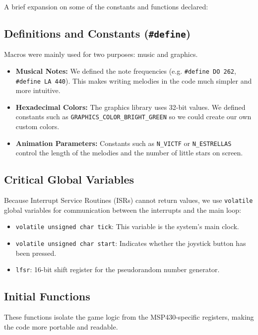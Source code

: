 \documentclass[11pt]{article}
\begin{document}
A brief expansion on some of the constants and functions declared:

\subsection{Definitions and Constants (\texttt{\#define})}

Macros were mainly used for two purposes: music and graphics.

\begin{itemize}
    \item \textbf{Musical Notes:} We defined the note frequencies (e.g. \texttt{\#define DO 262}, \texttt{\#define LA 440}). This makes writing melodies in the code much simpler and more intuitive.
    \item \textbf{Hexadecimal Colors:} The graphics library uses 32-bit values. We defined constants such as \texttt{GRAPHICS\_COLOR\_BRIGHT\_GREEN} so we could create our own custom colors.
    \item \textbf{Animation Parameters:} Constants such as \texttt{N\_VICTF} or \texttt{N\_ESTRELLAS} control the length of the melodies and the number of little stars on screen.
\end{itemize}

\subsection{Critical Global Variables}

Because Interrupt Service Routines (ISRs) cannot return values, we use \texttt{volatile} global variables for communication between the interrupts and the main loop:

\begin{itemize}
    \item \texttt{volatile unsigned char tick}: This variable is the system's main clock.
    \item \texttt{volatile unsigned char start}: Indicates whether the joystick button has been pressed.
    \item \texttt{lfsr}: 16-bit shift register for the pseudorandom number generator.
\end{itemize}

\subsection{Initial Functions}

These functions isolate the game logic from the MSP430-specific registers, making the code more portable and readable.
\end{document}
